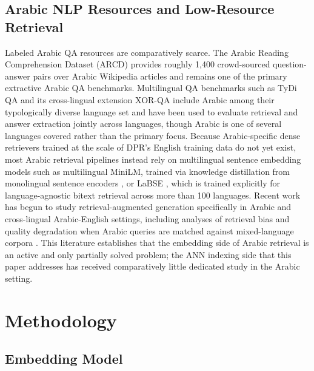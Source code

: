 \documentclass[conference]{IEEEtran}
\begin{document}
\subsection{Arabic NLP Resources and Low-Resource Retrieval}

Labeled Arabic QA resources are comparatively scarce. The Arabic Reading Comprehension Dataset (ARCD) \cite{mozannar2019neural} provides roughly 1,400 crowd-sourced question-answer pairs over Arabic Wikipedia articles and remains one of the primary extractive Arabic QA benchmarks. Multilingual QA benchmarks such as TyDi QA \cite{clark2020tydi} and its cross-lingual extension XOR-QA \cite{asai2021xor} include Arabic among their typologically diverse language set and have been used to evaluate retrieval and answer extraction jointly across languages, though Arabic is one of several languages covered rather than the primary focus. Because Arabic-specific dense retrievers trained at the scale of DPR's English training data do not yet exist, most Arabic retrieval pipelines instead rely on multilingual sentence embedding models such as multilingual MiniLM, trained via knowledge distillation from monolingual sentence encoders \cite{reimers2020making}, or LaBSE \cite{feng2022language}, which is trained explicitly for language-agnostic bitext retrieval across more than 100 languages. Recent work has begun to study retrieval-augmented generation specifically in Arabic and cross-lingual Arabic-English settings, including analyses of retrieval bias and quality degradation when Arabic queries are matched against mixed-language corpora \cite{arabicrag2024,crosslingualcost2025}. This literature establishes that the embedding side of Arabic retrieval is an active and only partially solved problem; the ANN indexing side that this paper addresses has received comparatively little dedicated study in the Arabic setting.

\section{Methodology}

\subsection{Embedding Model}
\end{document}
